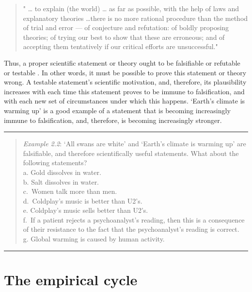 \documentclass[
]{book}
\begin{document}
\begin{quote}
" \ldots{} to explain (the world) \ldots{} as far as possible, with the help of laws and explanatory theories \ldots there is no more rational procedure than the method of trial and error --- of conjecture and refutation: of boldly proposing theories; of trying our best to show that these are erroneous; and of accepting them tentatively if our critical efforts are unsuccessful."
\end{quote}

Thus, a proper scientific statement or theory ought to be falsifiable or refutable or testable \citep{Popp63}. In other words, it must be possible to prove this statement or theory wrong. A testable statement's scientific motivation, and, therefore, its plausibility increases with each time this statement proves to be immune to falsification, and with each new set of circumstances under which this happens. `Earth's climate is warming up' is a good example of a statement that is becoming increasingly immune to falsification, and, therefore, is becoming increasingly stronger.

\begin{center}\rule{0.5\linewidth}{0.5pt}\end{center}

\begin{quote}
\emph{Example 2.2}: `All swans are white' and `Earth's climate is warming up' are falsifiable, and therefore scientifically useful statements. What about the following statements?\\
a. Gold dissolves in water.\\
b. Salt dissolves in water.\\
c.~Women talk more than men.\\
d.~Coldplay's music is better than U2's.\\
e. Coldplay's music sells better than U2's.\\
f.~If a patient rejects a psychoanalyst's reading, then this is a consequence of their resistance to the fact that the psychoanalyst's reading is correct.\\
g. Global warming is caused by human activity.
\end{quote}

\begin{center}\rule{0.5\linewidth}{0.5pt}\end{center}

\hypertarget{sec:empiricalcycle}{%
\section{The empirical cycle}\label{sec:empiricalcycle}}
\end{document}
